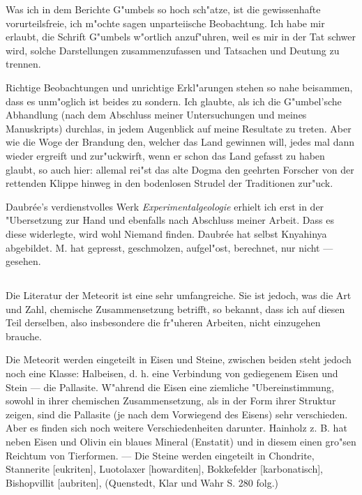 \documentclass[a4paper, 11pt, oneside]{article}
\begin{document}
Was ich in dem Berichte G"umbels so hoch sch"atze, ist die gewissenhafte vorurteilsfreie, ich m"ochte sagen unparteiische Beobachtung. Ich habe mir erlaubt, die Schrift G"umbels w"ortlich anzuf"uhren, weil es mir in der Tat schwer wird, solche Darstellungen zusammenzufassen und Tatsachen und Deutung zu trennen.

Richtige Beobachtungen und unrichtige Erkl"arungen stehen so nahe beisammen, dass es unm"oglich ist beides zu sondern. Ich glaubte, als ich die G"umbel'sche Abhandlung (nach dem Abschluss meiner Untersuchungen und meines Manuskripts) durchlas, in jedem Augenblick auf meine Resultate zu treten. Aber wie die Woge der Brandung den, welcher das Land gewinnen will, jedes mal dann wieder ergreift und zur"uckwirft, wenn er schon das Land gefasst zu haben glaubt, so auch hier: allemal rei"st das alte Dogma den geehrten Forscher von der rettenden Klippe hinweg in den bodenlosen Strudel der Traditionen zur"uck.

Daubrée's verdienstvolles Werk \emph{Experimentalgeologie} erhielt ich erst in der "Ubersetzung zur Hand und ebenfalls nach Abschluss meiner Arbeit. Dass es diese widerlegte, wird wohl Niemand finden. Daubrée hat selbst Knyahinya abgebildet. M. hat gepresst, geschmolzen, aufgel"ost, berechnet, nur nicht --- gesehen.
\clearpage
\subsection{}
\paragraph{}
Die Literatur der Meteorit ist eine sehr umfangreiche. Sie ist jedoch, was die Art und Zahl, chemische Zusammensetzung betrifft, so bekannt, dass ich auf diesen Teil derselben, also insbesondere die fr"uheren Arbeiten, nicht einzugehen brauche.

Die Meteorit werden eingeteilt in Eisen und Steine, zwischen beiden steht jedoch noch eine Klasse: Halbeisen, d. h. eine Verbindung von gediegenem Eisen und Stein --- die Pallasite. W"ahrend die Eisen eine ziemliche "Ubereinstimmung, sowohl in ihrer chemischen Zusammensetzung, als in der Form ihrer Struktur zeigen, sind die Pallasite (je nach dem Vorwiegend des Eisens) sehr verschieden. Aber es finden sich noch weitere Verschiedenheiten darunter. Hainholz z. B. hat neben Eisen und Olivin ein blaues Mineral (Enstatit) und in diesem einen gro"sen Reichtum von Tierformen. --- Die Steine werden eingeteilt in Chondrite, Stannerite [eukriten], Luotolaxer [howarditen], Bokkefelder [karbonatisch], Bishopvillit [aubriten], (Quenstedt, Klar und Wahr S. 280 folg.)
\end{document}
